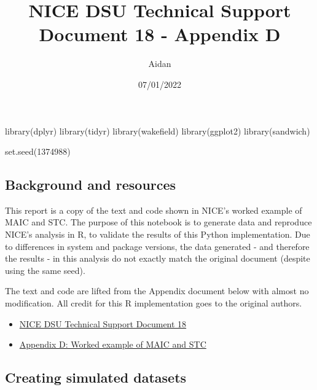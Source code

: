 \documentclass[
]{article}
\title{NICE DSU Technical Support Document 18 - Appendix D}
\author{Aidan}
\date{07/01/2022}
\newenvironment{Shaded}{\begin{snugshade}}{\end{snugshade}}
\newcommand{\DecValTok}[1]{\textcolor[rgb]{0.00,0.00,0.81}{#1}}
\newcommand{\FunctionTok}[1]{\textcolor[rgb]{0.00,0.00,0.00}{#1}}
\newcommand{\NormalTok}[1]{#1}
\providecommand{\tightlist}{%
  \setlength{\itemsep}{0pt}\setlength{\parskip}{0pt}}
\begin{document}
\maketitle

\begin{Shaded}
\begin{Highlighting}[]
\FunctionTok{library}\NormalTok{(dplyr)}
\FunctionTok{library}\NormalTok{(tidyr)}
\FunctionTok{library}\NormalTok{(wakefield)}
\FunctionTok{library}\NormalTok{(ggplot2)}
\FunctionTok{library}\NormalTok{(sandwich)}

\FunctionTok{set.seed}\NormalTok{(}\DecValTok{1374988}\NormalTok{)}
\end{Highlighting}
\end{Shaded}

\hypertarget{background-and-resources}{%
\subsection{Background and resources}\label{background-and-resources}}

This report is a copy of the text and code shown in NICE's worked
example of MAIC and STC. The purpose of this notebook is to generate
data and reproduce NICE's analysis in R, to validate the results of this
Python implementation. Due to differences in system and package
versions, the data generated - and therefore the results - in this
analysis do not exactly match the original document (despite using the
same seed).

The text and code are lifted from the Appendix document below with
almost no modification. All credit for this R implementation goes to the
original authors.

\begin{itemize}
\tightlist
\item
  \href{http://nicedsu.org.uk/wp-content/uploads/2018/08/Population-adjustment-TSD-FINAL-ref-rerun.pdf}{NICE
  DSU Technical Support Document 18}
\item
  \href{http://nicedsu.org.uk/wp-content/uploads/2017/05/TSD18-Appendix-D-Worked-example-of-MAIC-and-STC.pdf}{Appendix
  D: Worked example of MAIC and STC}
\end{itemize}

\hypertarget{creating-simulated-datasets}{%
\subsection{Creating simulated
datasets}\label{creating-simulated-datasets}}
\end{document}
